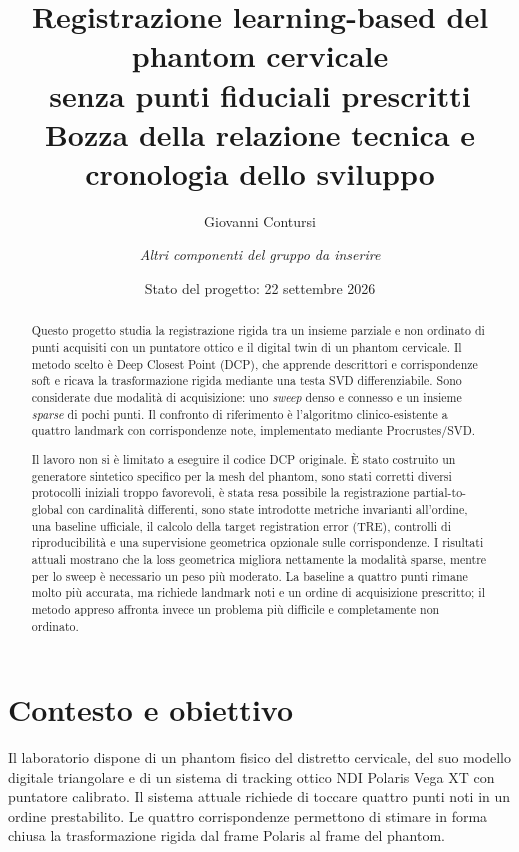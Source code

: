 \documentclass[11pt,a4paper]{article}
\title{%
    \textbf{Registrazione learning-based del phantom cervicale\\
    senza punti fiduciali prescritti}\\[0.4em]
    \large Bozza della relazione tecnica e cronologia dello sviluppo
}
\author{Giovanni Contursi \and \textit{Altri componenti del gruppo da inserire}}
\date{Stato del progetto: 22 settembre 2026}
\begin{document}
\maketitle

\begin{abstract}
Questo progetto studia la registrazione rigida tra un insieme parziale e non
ordinato di punti acquisiti con un puntatore ottico e il digital twin di un
phantom cervicale. Il metodo scelto è Deep Closest Point (DCP), che apprende
descrittori e corrispondenze soft e ricava la trasformazione rigida mediante
una testa SVD differenziabile. Sono considerate due modalità di acquisizione:
uno \emph{sweep} denso e connesso e un insieme \emph{sparse} di pochi punti.
Il confronto di riferimento è l'algoritmo clinico-esistente a quattro
landmark con corrispondenze note, implementato mediante Procrustes/SVD.

Il lavoro non si è limitato a eseguire il codice DCP originale. È stato
costruito un generatore sintetico specifico per la mesh del phantom, sono
stati corretti diversi protocolli iniziali troppo favorevoli, è stata resa
possibile la registrazione partial-to-global con cardinalità differenti, sono
state introdotte metriche invarianti all'ordine, una baseline ufficiale, il
calcolo della target registration error (TRE), controlli di riproducibilità e
una supervisione geometrica opzionale sulle corrispondenze. I risultati
attuali mostrano che la loss geometrica migliora nettamente la modalità
sparse, mentre per lo sweep è necessario un peso più moderato. La baseline a
quattro punti rimane molto più accurata, ma richiede landmark noti e un ordine
di acquisizione prescritto; il metodo appreso affronta invece un problema più
difficile e completamente non ordinato.
\end{abstract}

\tableofcontents
\newpage

\section{Contesto e obiettivo}

Il laboratorio dispone di un phantom fisico del distretto cervicale, del suo
modello digitale triangolare e di un sistema di tracking ottico NDI Polaris
Vega XT con puntatore calibrato. Il sistema attuale richiede di toccare quattro
punti noti in un ordine prestabilito. Le quattro corrispondenze permettono di
stimare in forma chiusa la trasformazione rigida dal frame Polaris al frame
del phantom.
\end{document}
